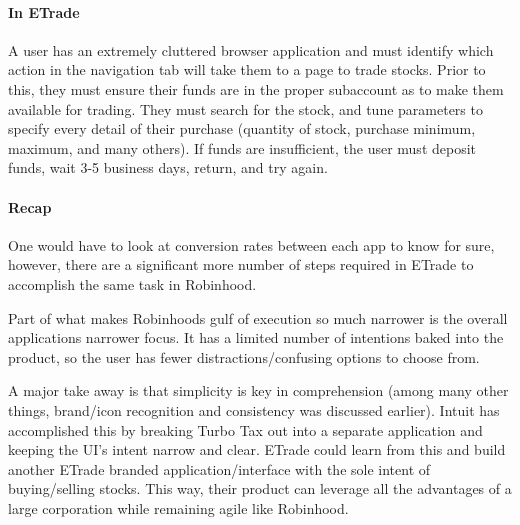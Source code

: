 \paragraph{In ETrade}
A user has an extremely cluttered browser application and must identify which action in the navigation tab will take them to a page to trade stocks. Prior to this, they must ensure their funds are in the proper subaccount as to make them available for trading. They must search for the stock, and tune parameters to specify every detail of their purchase (quantity of stock, purchase minimum, maximum, and many others). If funds are insufficient, the user must deposit funds, wait 3-5 business days, return, and try again.

\paragraph{Recap}
One would have to look at conversion rates between each app to know for sure, however, there are a significant more number of steps required in ETrade to accomplish the same task in Robinhood.

Part of what makes Robinhoods gulf of execution so much narrower is the overall applications narrower focus. It has a limited number of intentions baked into the product, so the user has fewer distractions/confusing options to choose from.

A major take away is that simplicity is key in comprehension (among many other things, brand/icon recognition and consistency was discussed earlier). Intuit has accomplished this by breaking Turbo Tax out into a separate application and keeping the UI's intent narrow and clear. ETrade could learn from this and build another ETrade branded application/interface with the sole intent of buying/selling stocks. This way, their product can leverage all the advantages of a large corporation while remaining agile like Robinhood.


